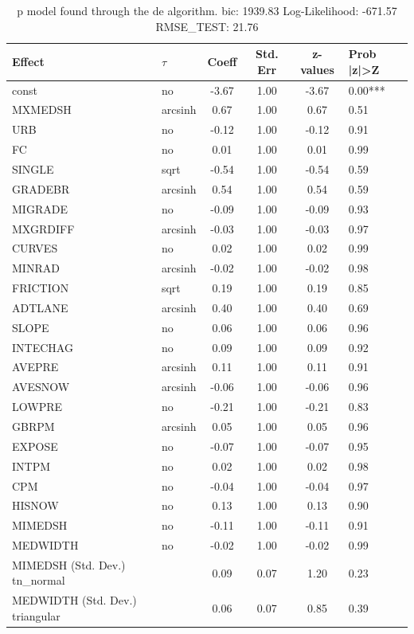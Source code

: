 \begin{table}
	\caption{p model found through the de algorithm. bic: 1939.83 Log-Likelihood: -671.57 RMSE_TEST: 21.76}
	\begin{center}
		\begin{tabular}{|l|l|c|c|c|l|}
			\hline
			Effect & $\tau$ & Coeff & Std. Err & z-values & Prob |z|>Z \\
			\hline
			const & no & -3.67 & 1.00 & -3.67 & 0.00*** \\
			\hline
			MXMEDSH & arcsinh & 0.67 & 1.00 & 0.67 & 0.51 \\
			\hline
			URB & no & -0.12 & 1.00 & -0.12 & 0.91 \\
			\hline
			FC & no & 0.01 & 1.00 & 0.01 & 0.99 \\
			\hline
			SINGLE & sqrt & -0.54 & 1.00 & -0.54 & 0.59 \\
			\hline
			GRADEBR & arcsinh & 0.54 & 1.00 & 0.54 & 0.59 \\
			\hline
			MIGRADE & no & -0.09 & 1.00 & -0.09 & 0.93 \\
			\hline
			MXGRDIFF & arcsinh & -0.03 & 1.00 & -0.03 & 0.97 \\
			\hline
			CURVES & no & 0.02 & 1.00 & 0.02 & 0.99 \\
			\hline
			MINRAD & arcsinh & -0.02 & 1.00 & -0.02 & 0.98 \\
			\hline
			FRICTION & sqrt & 0.19 & 1.00 & 0.19 & 0.85 \\
			\hline
			ADTLANE & arcsinh & 0.40 & 1.00 & 0.40 & 0.69 \\
			\hline
			SLOPE & no & 0.06 & 1.00 & 0.06 & 0.96 \\
			\hline
			INTECHAG & no & 0.09 & 1.00 & 0.09 & 0.92 \\
			\hline
			AVEPRE & arcsinh & 0.11 & 1.00 & 0.11 & 0.91 \\
			\hline
			AVESNOW & arcsinh & -0.06 & 1.00 & -0.06 & 0.96 \\
			\hline
			LOWPRE & no & -0.21 & 1.00 & -0.21 & 0.83 \\
			\hline
			GBRPM & arcsinh & 0.05 & 1.00 & 0.05 & 0.96 \\
			\hline
			EXPOSE & no & -0.07 & 1.00 & -0.07 & 0.95 \\
			\hline
			INTPM & no & 0.02 & 1.00 & 0.02 & 0.98 \\
			\hline
			CPM & no & -0.04 & 1.00 & -0.04 & 0.97 \\
			\hline
			HISNOW & no & 0.13 & 1.00 & 0.13 & 0.90 \\
			\hline
			MIMEDSH & no & -0.11 & 1.00 & -0.11 & 0.91 \\
			\hline
			MEDWIDTH & no & -0.02 & 1.00 & -0.02 & 0.99 \\
			\hline
			MIMEDSH (Std. Dev.) tn_normal &  & 0.09 & 0.07 & 1.20 & 0.23 \\
			\hline
			MEDWIDTH (Std. Dev.) triangular &  & 0.06 & 0.07 & 0.85 & 0.39 \\
			\hline
		\end{tabular}
	\end{center}
\end{table}